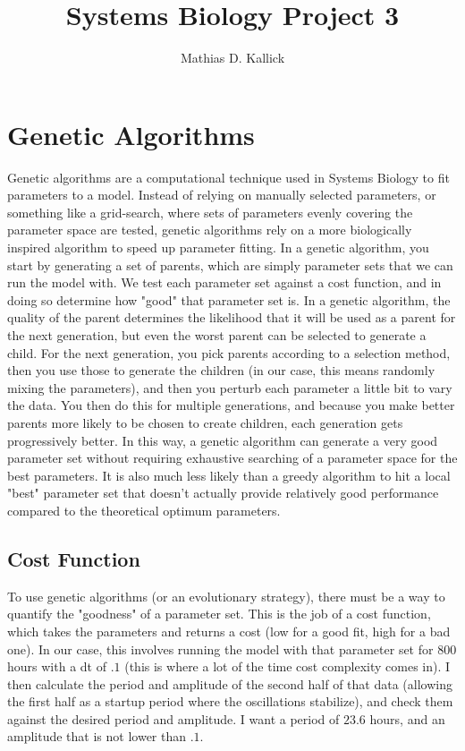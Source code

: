 \documentclass[]{article}
\title{Systems Biology Project 3}
\author{Mathias D. Kallick}
\begin{document}
\maketitle

\section{Genetic Algorithms}
Genetic algorithms are a computational technique used in Systems Biology to fit parameters to a model. Instead of relying on manually selected parameters, or something like a grid-search, where sets of parameters evenly covering the parameter space are tested, genetic algorithms rely on a more biologically inspired algorithm to speed up parameter fitting. In a genetic algorithm, you start by generating a set of parents, which are simply parameter sets that we can run the model with. We test each parameter set against a cost function, and in doing so determine how "good" that parameter set is. In a genetic algorithm, the quality of the parent determines the likelihood that it will be used as a parent for the next generation, but even the worst parent can be selected to generate a child. For the next generation, you pick parents according to a selection method, then you use those to generate the children (in our case, this means randomly mixing the parameters), and then you perturb each parameter a little bit to vary the data. You then do this for multiple generations, and because you make better parents more likely to be chosen to create children, each generation gets progressively better. In this way, a genetic algorithm can generate a very good parameter set without requiring exhaustive searching of a parameter space for the best parameters. It is also much less likely than a greedy algorithm to hit a local "best" parameter set that doesn't actually provide relatively good performance compared to the theoretical optimum parameters.

\subsection{Cost Function}
To use genetic algorithms (or an evolutionary strategy), there must be a way to quantify the "goodness" of a parameter set. This is the job of a cost function, which takes the parameters and returns a cost (low for a good fit, high for a bad one). In our case, this involves running the model with that parameter set for $800$ hours with a dt of $.1$ (this is where a lot of the time cost complexity comes in). I then calculate the period and amplitude of the second half of that data (allowing the first half as a startup period where the oscillations stabilize), and check them against the desired period and amplitude. I want a period of $23.6$ hours, and an amplitude that is not lower than $.1$.
\end{document}
